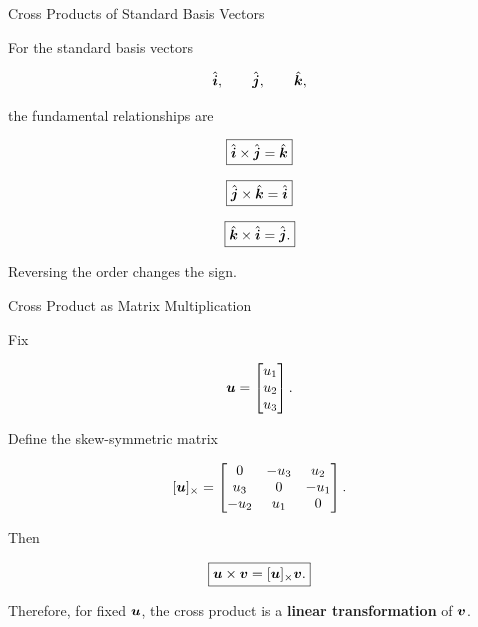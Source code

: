 \begin{frame}{Cross Products of Standard Basis Vectors}

For the standard basis vectors

\[
\hat{\bm{i}},
\qquad
\hat{\bm{j}},
\qquad
\hat{\bm{k}},
\]

the fundamental relationships are

\[
\boxed{
\hat{\bm{i}}\times\hat{\bm{j}}
=
\hat{\bm{k}}
}
\]

\[
\boxed{
\hat{\bm{j}}\times\hat{\bm{k}}
=
\hat{\bm{i}}
}
\]

\[
\boxed{
\hat{\bm{k}}\times\hat{\bm{i}}
=
\hat{\bm{j}}.
}
\]

Reversing the order changes the sign.

\end{frame}



\begin{frame}{Cross Product as Matrix Multiplication}

Fix

\[
\bm{u}
=
\begin{bmatrix}
u_1\\
u_2\\
u_3
\end{bmatrix}.
\]

Define the skew-symmetric matrix

\[
[\bm{u}]_{\times}
=
\begin{bmatrix}
0&-u_3&u_2\\
u_3&0&-u_1\\
-u_2&u_1&0
\end{bmatrix}.
\]

Then

\[
\boxed{
\bm{u}\times\bm{v}
=
[\bm{u}]_{\times}\bm{v}.
}
\]

Therefore, for fixed $\bm{u}$, the cross product is a
\textbf{linear transformation} of $\bm{v}$.

\end{frame}



